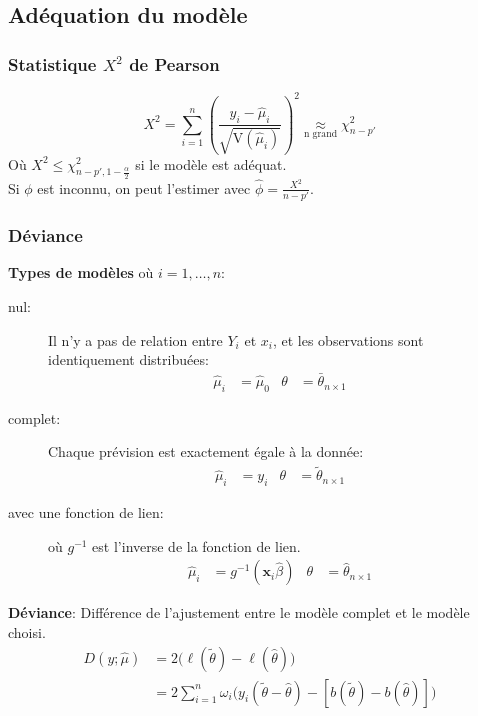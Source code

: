 \documentclass[10pt, french]{article}
\begin{document}
\begin{multicols*}{3}
\subsection*{Adéquation du modèle}
\subsubsection*{Statistique $X^2$ de Pearson}
\begin{equation*}
	X^2 
	= 	\sum_{i = 1}^{n} \left( \frac{y_i -  \hat{\mu}_i}{\sqrt{\text{V}(\hat{\mu}_i)}} \right)^2   
	\underset{\text{n grand}}{\approx} \chi_{n-p'}^2 
\end{equation*}
Où $X^2 \leq \chi_{n-p', 1 - \frac{\alpha}{2}}^2$ si le modèle est adéquat.\\
Si $\phi$ est inconnu, on peut l'estimer avec $\hat{\phi} = \frac{X^2}{n-p'}$.

\subsubsection*{Déviance}

\textbf{Types de modèles} où $i = 1, \dots, n$:
\begin{description}
	\item[nul: ] Il n'y a pas de relation entre $Y_{i}$ et $x_{i}$, et les observations sont identiquement distribuées:
	\begin{align*}
		\hat{\mu}_{i} &= \hat{\mu}_{0}	&
		\theta &= \bar{\theta}_{n \times 1}
	\end{align*}
	\item[complet: ] Chaque prévision est exactement égale à la donnée:
	\begin{align*}
		\hat{\mu}_{i} &= y_{i}	&
		\theta &= \tilde{\theta}_{n \times 1}
	\end{align*}
	\item[avec une fonction de lien: ] où $g^{-1}$ est l'inverse de la fonction de lien.
	\begin{align*}
		\hat{\mu}_{i} &= g^{-1}(\bm{x}_{i}\hat{\beta})	&
		\theta &= \hat{\theta}_{n \times 1}
	\end{align*}
\end{description}

\textbf{Déviance}: Différence de l'ajustement entre le modèle complet et le modèle choisi.
	\begin{align*}
		D(y; \hat{\mu}) 
		&= 	2 \big(\ell(\tilde{\theta}) - \ell(\hat{\theta})\big) \\
		&= 	2 \sum_{i = 1}^{n} \omega_{i} \bigg( y_{i} (\tilde{\theta} - \hat{\theta}) - [b(\tilde{\theta}) - b(\hat{\theta})] \bigg)
	\end{align*}
	

\end{multicols*}
\end{document}
